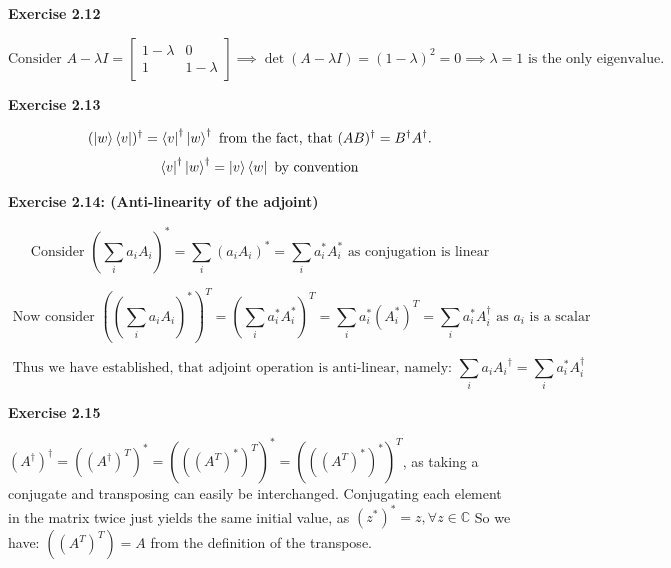 \documentclass{article}
\begin{document}
\bigskip

\begin{framed}
    \noindent \textbf{Exercise 2.12}
    
    \medskip

    $$
    \text{Consider } A - \lambda I = \begin{bmatrix}1 - \lambda & 0 \\ 1& 1 - \lambda\end{bmatrix} \implies \det(A -\lambda I) = (1 - \lambda)^{2} = 0 \implies \lambda = 1 \text{ is the only eigenvalue.}
    $$
    
\end{framed}

\bigskip

\begin{framed}
    \noindent \textbf{Exercise 2.13}
    
    \medskip

    $$
    (\ket{w}\bra{v})^{\dagger} = \bra{v}^{\dagger}\ket{w}^{\dagger} \text{ from the fact, that } (AB)^{\dagger} = B^{\dagger}A^{\dagger}. 
    $$
    $$
        \bra{v}^{\dagger}\ket{w}^{\dagger} = \ket{v}\bra{w} \text{ by convention}
    $$
    
\end{framed}

\bigskip

\begin{framed}
    \noindent \textbf{Exercise 2.14: (Anti-linearity of the adjoint)}
    
    \medskip

    $$
    \text{Consider } (\sum_i{a_iA_i})^{*} = \sum_i{(a_iA_i)^{*}} = \sum_i{a_i^*A_i^*} \text{ as conjugation is linear}
    $$

    $$
    \text{ Now consider } ((\sum_i{a_iA_i})^{*})^{T} = (\sum_i{a_i^*A_i^*})^{T} = \sum_i{a_i^*(A_i^*)^{T}} = \sum_i{a_i^*A_i^{\dagger}}\text{ as } a_i \text{ is a scalar }
    $$

    $$
    \text{ Thus we have established, that adjoint operation is anti-linear, namely: } \sum_i{a_iA_i}^{\dagger} = \sum_i{a_i^{*}A_i^{\dagger}}
    $$
    
    
\end{framed}

\bigskip

\begin{framed}
    \noindent \textbf{Exercise 2.15}
    
    \medskip
    
    $(A^{\dagger})^{\dagger} = ((A^{\dagger})^{T})^{*} = (((A^{T})^{*})^{T})^{*} = (((A^{T})^{*})^{*})^{T}$, as taking a conjugate and transposing can easily be interchanged. Conjugating each element in the matrix twice just yields the same initial value, as $(z^{*})^{*} = z , \forall z \in \mathbb{C}$ So we have: $((A^T)^T) = A$ from the definition of the transpose. 
    
\end{framed}
\end{document}
